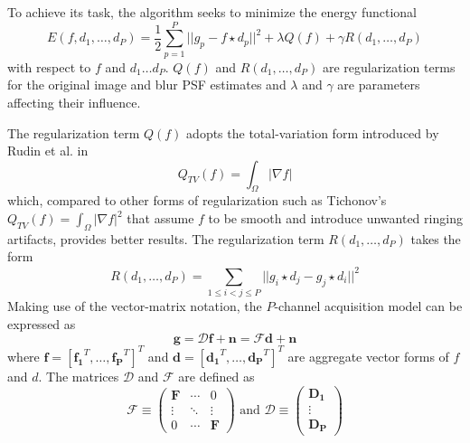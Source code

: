 \documentclass[12pt,notitlepage]{report}
\begin{document}
To achieve its task, the algorithm seeks to minimize the energy functional 
\begin{equation}
\label{eq:srou03_energy}
	E(f, d_1, \dots, d_P) = \frac{1}{2} \sum_{p=1}^{P} || g_p - f \star d_p ||^2 + \lambda Q(f) + \gamma R(d_1, \dots , d_P)	
\end{equation}
with respect to $f$ and $d_1 \dots d_P$. $Q(f)$ and $R(d_1, \dots, d_P)$ are regularization terms for the original image and blur PSF estimates and $\lambda$ and $\gamma$ are parameters affecting their influence. 

The regularization term $Q(f)$ adopts the total-variation form introduced by Rudin et al. in \cite{rudi92}
\begin{equation}
\label{eq:srou03_Q_TV}
	Q_{TV}(f) = \int_{\Omega}{} |\nabla f| 	
\end{equation}
which, compared to other forms of regularization such as Tichonov's $Q_{TV}(f) = \int_{\Omega}{} |\nabla f|^2$ that assume $f$ to be smooth and introduce unwanted ringing artifacts, provides better results. 
The regularization term $R(d_1, \dots, d_P)$ takes the form 
\begin{equation}
\label{eq:srou03_R}
	R(d_1, \dots, d_P) = \sum_{1 \leq i < j \leq P}^{} || g_i \star d_j - g_j \star d_i ||^2 	
\end{equation}
Making use of the vector-matrix notation, the $P$-channel acquisition model can be expressed as 
\begin{equation}
\label{eq:srou03_general_model_vec}
	\mathbf{g} = \mathcal{D}\mathbf{f} + \mathbf{n} = \mathcal{F}\mathbf{d} + \mathbf{n} 	
\end{equation}
where $\mathbf{f} = [\mathbf{f_1}^T, \dots, \mathbf{f_P}^T]^T$ and $\mathbf{d} = [\mathbf{d_1}^T, \dots, \mathbf{d_P}^T]^T$ are aggregate vector forms of $f$ and $d$. The matrices $\mathcal{D}$ and $\mathcal{F}$ are defined as 
\begin{equation}
\label{eq:srou03_general_model_vec}
	\mathcal{F} \equiv \begin{pmatrix} \mathbf{F} & \cdots & 0 \\ \vdots & \ddots & \vdots \\ 0 & \cdots & \mathbf{F} \end{pmatrix} \text{ and } \mathcal{D} \equiv \begin{pmatrix} \mathbf{D_1} \\ \vdots \\ \mathbf{D_P} \end{pmatrix}  	
\end{equation}
\end{document}
